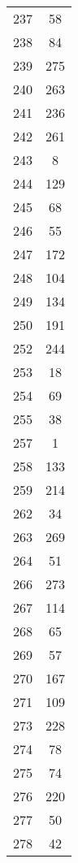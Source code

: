 \documentclass[10pt,letterpaper]{article}\usepackage[]{graphicx}\usepackage[]{color}
\begin{document}
\begin{center}
\begin{longtable}[c]{cc}
		237	& 58 \\
		238	& 84 \\
		239	& 275 \\
		240	& 263 \\
		241	& 236 \\
		242	& 261 \\
		243	& 8 \\
		244	& 129 \\
		245	& 68 \\
		246	& 55 \\
		247	& 172 \\
		248	& 104 \\
		249	& 134 \\
		250	& 191 \\
		252	& 244 \\
		253	& 18 \\
		254	& 69 \\
		255	& 38 \\
		257	& 1 \\
		258	& 133 \\
		259	& 214 \\
		262	& 34 \\
		263	& 269 \\
		264	& 51 \\
		266	& 273 \\
		267	& 114 \\
		268	& 65 \\
		269	& 57 \\
		270	& 167 \\
		271	& 109 \\
		273	& 228 \\
		274	& 78 \\
		275	& 74 \\
		276	& 220 \\
		277	& 50 \\
		278	& 42 \\
\end{longtable}
\end{center}
\end{document}

